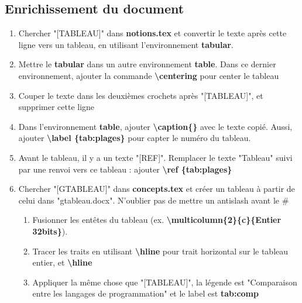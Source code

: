 \documentclass[11pt, a4paper]{article}
\begin{document}
\subsection*{Enrichissement du document}

\begin{enumerate}
	\item Chercher "[TABLEAU]" dans \textbf{notions.tex} et convertir le texte après cette ligne vers un tableau, en utilisant l'environnement \textbf{tabular}.
	\item Mettre le \textbf{tabular} dans un autre environnement \textbf{table}. Dans ce dernier environnement, ajouter la commande \textbf{\textbackslash centering} pour center le tableau
	\item Couper le texte dans les deuxièmes crochets après "[TABLEAU]", et supprimer cette ligne
	\item Dans l'environnement \textbf{table}, ajouter \textbf{\textbackslash caption\{\}} avec le texte copié. Aussi, ajouter \textbf{\textbackslash label \{tab:plages\}} pour capter le numéro du tableau.
	\item Avant le tableau, il y a un texte "[REF]". Remplacer le texte "Tableau" suivi par une renvoi vers ce tableau : ajouter \textbf{\textbackslash ref \{tab:plages\}}
	\item Chercher "[GTABLEAU]" dans \textbf{concepts.tex} et créer un tableau à partir de celui dans "gtableau.docx". N'oublier pas de mettre un antislash avant le \#
	\begin{enumerate}
		\item Fusionner les entêtes du tableau (ex. \textbf{\textbackslash multicolumn\{2\}\{c\}\{Entier 32bits\}}). 
		\item Tracer les traits en utilisant \textbf{\textbackslash hline} pour trait horizontal sur le tableau entier, et \textbf{\textbackslash hline}
		\item Appliquer la même chose que "[TABLEAU]", la légende est "Comparaison entre les langages de programmation" et le label est \textbf{tab:comp}
	\end{enumerate}


\end{enumerate}
\end{document}
